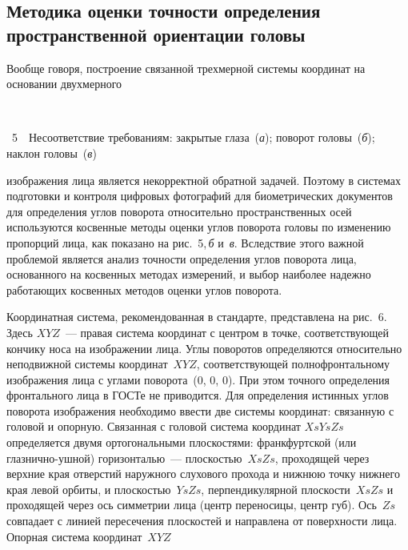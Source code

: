 \begin{multicols}{2}
\section{Методика оценки точности определения пространственной ориентации головы}

Вообще говоря, построение связанной трехмерной системы координат на основании двухмерного\linebreak\vspace*{-12pt}
\pagebreak

\begin{center} %
\vspace*{2pt}
\mbox{%
\epsfxsize=80mm
}
\end{center}
\vspace*{6pt}
{{\figurename~5}\ \ \small{Несоответствие требованиям: закрытые глаза~(\textit{а}); 
поворот головы~(\textit{б}); наклон головы~(\textit{в})}}


\addtocounter{figure}{1}
\columnbreak

\noindent
 изображения лица является 
некорректной обратной задачей. Поэтому в системах подготовки и контроля цифровых фотографий для биометрических 
документов для определения углов поворота относительно пространственных осей используются косвенные методы оценки углов 
поворота головы по изменению пропорций лица, как показано на рис.~5,\,\textit{б}  и~\textit{в}.
Вследствие этого важной 
проблемой является анализ точности определения углов поворота лица, основанного на косвенных методах измерений, и выбор 
наиболее надежно работающих косвенных методов оценки углов поворота.

Координатная система, рекомендованная в стандарте, представлена на рис.~6. Здесь $XYZ$~--- правая система 
координат с центром в точке, соответствующей кончику носа на изображении лица. Углы поворотов определяются 
относительно неподвижной системы координат~$XYZ$, соответствующей полнофронтальному изображения 
лица с углами поворота~(0, 0, 0). 
При этом точного %
 определения фронтального лица в ГОСТе не приводится. Для определения истинных углов поворота 
изображения необходимо ввести две системы координат: связанную с головой и опорную. Связанная с головой система 
координат $XsYsZs$ определяется двумя ортогональными плоскостями: франкфуртской (или глазнично-ушной) го\-ри\-зон\-талью~--- 
плос\-костью~$XsZs$, проходящей через верхние края отверстий наружного слухового прохода и нижнюю точку нижнего края 
левой орбиты, и плос\-костью~$YsZs$, перпендикулярной плос\-кости~$XsZs$ и проходящей через ось симметрии лица (центр 
переносицы, центр губ). Ось~$Zs$ совпадает с линией пересечения плоскостей и направлена от поверхности лица. Опорная 
система координат~$XYZ$\linebreak


\end{multicols}
